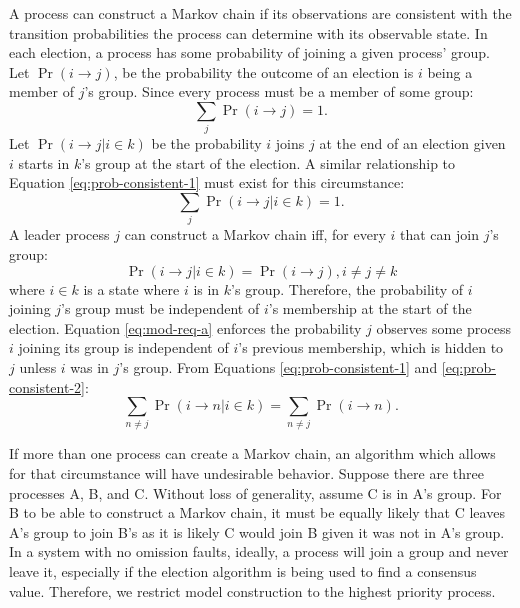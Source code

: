 A process can construct a Markov chain if its observations are consistent with the transition probabilities the process can determine with its observable state.
In each election, a process has some probability of joining a given process' group.
Let $\Pr(i \rightarrow j)$, be the probability the outcome of an election is $i$ being a member of $j$'s group.
Since every process must be a member of some group:
\begin{equation}
\sum_{j} \Pr(i \rightarrow j) = 1.
\label{eq:prob-consistent-1}
\end{equation}
Let $\Pr(i \rightarrow j | i \in k)$ be the probability $i$ joins $j$ at the end of an election given $i$ starts in $k$'s group at the start of the election.
A similar relationship to Equation \ref{eq:prob-consistent-1} must exist for this circumstance:
\begin{equation}
\sum_{j} \Pr(i \rightarrow j | i \in k) = 1.
\label{eq:prob-consistent-2}
\end{equation}
A leader process $j$ can construct a Markov chain iff, for every $i$ that can join $j$'s group:
\begin{equation}
\Pr(i \rightarrow j | i \in k) = \Pr(i \rightarrow j), i \neq j \neq k
\label{eq:mod-req-a}
\end{equation}
where $i \in k$ is a state where $i$ is in $k$'s group.
Therefore, the probability of $i$ joining $j$'s group must be independent of $i$'s membership at the start of the election.
Equation \ref{eq:mod-req-a} enforces the probability $j$ observes some process $i$ joining its group is independent of $i$'s previous membership, which is hidden to $j$ unless $i$ was in $j$'s group.
From Equations \ref{eq:prob-consistent-1} and \ref{eq:prob-consistent-2}:
\begin{equation}
\sum_{n \neq j} \Pr(i \rightarrow n | i \in k) = \sum_{n\neq j} \Pr(i \rightarrow n).
\label{eq:mod-req-b}
\end{equation}

If more than one process can create a Markov chain, an algorithm which allows for that circumstance will have undesirable behavior.
Suppose there are three processes A, B, and C.
Without loss of generality, assume C is in A's group.
For B to be able to construct a Markov chain, it must be equally likely that C leaves A's group to join B's as it is likely C would join B given it was not in A's group.
In a system with no omission faults, ideally, a process will join a group and never leave it, especially if the election algorithm is being used to find a consensus value.
Therefore, we restrict model construction to the highest priority process.

